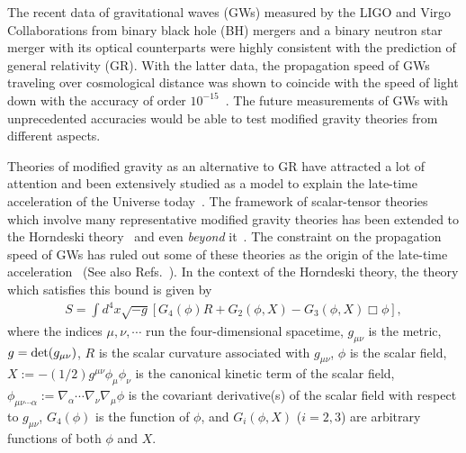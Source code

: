 \documentclass[prd,amsmath,amssymb,floatfix,superscriptaddress,notitlepage,nofootinbib,preprintnumbers]{revtex4-1}
\begin{document}
The recent data of gravitational waves (GWs) 
measured by the LIGO and Virgo Collaborations
from binary black hole (BH) mergers 
\cite{Abbott:2016blz,Abbott:2016nmj} 
and a binary neutron star merger
\cite{TheLIGOScientific:2017qsa}
with its optical counterparts \cite{GBM:2017lvd}
were highly consistent with the prediction of general relativity (GR).
With the latter data, 
the propagation speed of GWs traveling over cosmological distance
was shown to coincide with the speed of light down 
with the accuracy of order $10^{-15}$~\cite{Monitor:2017mdv}.
The future measurements of GWs with unprecedented accuracies
would be able to test modified gravity theories from different aspects.



Theories of modified gravity as an alternative to GR have attracted a lot of attention and  been extensively studied as a model to explain the late-time acceleration of the Universe today~\cite{Clifton:2011jh,Berti:2015itd,Koyama:2015vza}.
The framework of scalar-tensor theories
which involve many representative modified gravity theories
has been extended 
to the Horndeski theory~\cite{Horndeski:1974wa,Nicolis:2008in,Deffayet:2009wt,Deffayet:2009mn,Deffayet:2011gz,Kobayashi:2011nu}
and even {\it beyond} it~\cite{Zumalacarregui:2013pma,Gleyzes:2014dya,Gleyzes:2014qga,Motohashi:2014opa,Langlois:2015cwa,Motohashi:2016ftl,Klein:2016aiq,BenAchour:2016fzp,Motohashi:2017eya,Motohashi:2018pxg}. 
The constraint on the propagation speed of GWs 
has ruled out some of these theories
as the origin of the late-time acceleration~\cite{Creminelli:2017sry,Sakstein:2017xjx,Ezquiaga:2017ekz,Baker:2017hug}
(See also Refs.~\cite{Lombriser:2015sxa,Lombriser:2016yzn}).
In the context of the Horndeski theory,
the theory which satisfies this bound 
is given by 
\begin{align}
\label{action}
 S=\int d^4x \sqrt{-g}
\left[
G_4 (\phi)
R 
+G_2 (\phi,X)
-G_3(\phi,X)\Box\phi
\right],
\end{align}
where
the indices $\mu,\nu,\cdots$ run the four-dimensional spacetime, 
$g_{\mu\nu}$ is the metric, 
$g={\rm det}(g_{\mu\nu})$,
$R$ is the scalar curvature associated with $g_{\mu\nu}$,
$\phi$ is the scalar field, 
$X:=-(1/2)g^{\mu\nu}\phi_\mu\phi_\nu$ is the canonical kinetic term of the scalar field,
$\phi_{\mu\nu\cdots\alpha}:= \nabla_\alpha\cdots \nabla_\nu\nabla_\mu \phi$
is the covariant derivative(s) of the scalar field
with respect to $g_{\mu\nu}$,
$G_4(\phi)$ is the function of $\phi$,
and 
$G_i (\phi, X)$ ($i=2,3$) are arbitrary functions of both $\phi$ and $X$.
\end{document}
